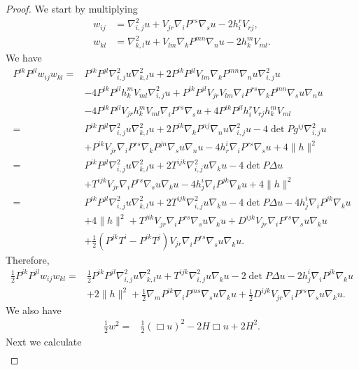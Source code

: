 \documentclass{amsart}
\theoremstyle{definition}
\theoremstyle{remark}
\numberwithin{equation}{section}
\begin{document}
\begin{proof}
We start by multiplying
\begin{align*}
w_{ij}&=\nabla^2_{i,j}u+V_{jr}\nabla_iP^{rs}\nabla_su-2h_i^rV_{rj},\\
w_{kl}&=\nabla^2_{k,l}u+V_{lm}\nabla_kP^{mn}\nabla_nu-2h_k^mV_{ml}.
\end{align*}
We have
\begin{align*}
P^{ik}P^{jl}w_{ij}w_{kl}=&P^{ik}P^{jl}\nabla^2_{i,j}u\nabla^2_{k,l}u+2P^{ik}P^{jl}V_{lm}\nabla_kP^{mn}\nabla_nu\nabla^2_{i,j}u\\
&-4P^{ik}P^{jl}h_k^mV_{ml}\nabla^2_{i,j}u+P^{ik}P^{jl}V_{jr}V_{lm}\nabla_iP^{rs}\nabla_kP^{mn}\nabla_su\nabla_nu\\
&-4P^{ik}P^{jl}V_{jr}h_k^mV_{ml}\nabla_iP^{rs}\nabla_su+4P^{ik}P^{jl}h_i^rV_{rj}h_k^mV_{ml}\\
=&P^{ik}P^{jl}\nabla^2_{i,j}u\nabla^2_{k,l}u+2P^{ik}\nabla_kP^{nj}\nabla_nu\nabla^2_{i,j}u-4\det P g^{ij}\nabla^2_{i,j}u\\
&+P^{ik}V_{jr}\nabla_iP^{rs}\nabla_kP^{jn}\nabla_su\nabla_nu-4h^i_r\nabla_iP^{rs}\nabla_su+4\|h\|^2\\
=&P^{ik}P^{jl}\nabla^2_{i,j}u\nabla^2_{k,l}u+ {2T^{ijk}\nabla^2_{i,j}u\nabla_ku}-4\det P \Delta u\\
&+T^{ijk}V_{jr}\nabla_iP^{rs}\nabla_su\nabla_ku-4h_{j}^i\nabla_iP^{jk}\nabla_ku+ {4\|h\|^2}\\
=&P^{ik}P^{jl}\nabla^2_{i,j}u\nabla^2_{k,l}u+ {2T^{ijk}\nabla^2_{i,j}u\nabla_ku}-4\det P \Delta u-4h_{j}^i\nabla_iP^{jk}\nabla_ku\\
&+ {4\|h\|^2}+T^{jik}V_{jr}\nabla_iP^{rs}\nabla_su\nabla_ku+D^{ijk}V_{jr}\nabla_iP^{rs}\nabla_su\nabla_ku\\
&+\frac{1}{2}\left(P^{jk}T^i-P^{ik}T^j\right)V_{jr}\nabla_iP^{rs}\nabla_su\nabla_ku.
\end{align*}
Therefore,
\begin{align*}
\frac{1}{2}P^{ik}P^{jl}w_{ij}w_{kl}=&\frac{1}{2}P^{ik}P^{jl}\nabla^2_{i,j}u\nabla^2_{k,l}u+ {T^{ijk}\nabla^2_{i,j}u\nabla_ku}-2\det P \Delta u-2h_{j}^i\nabla_iP^{jk}\nabla_ku\\
&+ {2\|h\|^2}+\frac{1}{2}\nabla_mP^{ik}\nabla_iP^{ms}\nabla_su\nabla_ku+\frac{1}{2}D^{ijk}V_{jr}\nabla_iP^{rs}\nabla_su\nabla_ku.
\end{align*}
We also have
\begin{align*}
\frac{1}{2}w^2=& {\frac{1}{2}(\Box u)^2-2H\Box u}+ {2H^2}.
\end{align*}
Next we calculate
\begin{align*}

\end{align*}
\end{proof}
\end{document}
